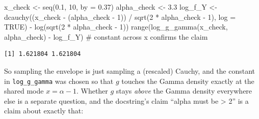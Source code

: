 \documentclass[
  letterpaper,
  DIV=11,
  numbers=noendperiod]{scrreprt}
\newenvironment{Shaded}{\begin{snugshade}}{\end{snugshade}}
\newcommand{\AttributeTok}[1]{\textcolor[rgb]{0.40,0.45,0.13}{#1}}
\newcommand{\CommentTok}[1]{\textcolor[rgb]{0.37,0.37,0.37}{#1}}
\newcommand{\ConstantTok}[1]{\textcolor[rgb]{0.56,0.35,0.01}{#1}}
\newcommand{\DecValTok}[1]{\textcolor[rgb]{0.68,0.00,0.00}{#1}}
\newcommand{\FloatTok}[1]{\textcolor[rgb]{0.68,0.00,0.00}{#1}}
\newcommand{\FunctionTok}[1]{\textcolor[rgb]{0.28,0.35,0.67}{#1}}
\newcommand{\NormalTok}[1]{\textcolor[rgb]{0.00,0.23,0.31}{#1}}
\newcommand{\OtherTok}[1]{\textcolor[rgb]{0.00,0.23,0.31}{#1}}
\newcommand{\SpecialCharTok}[1]{\textcolor[rgb]{0.37,0.37,0.37}{#1}}
\begin{document}
\begin{Shaded}
\begin{Highlighting}[]
\NormalTok{x\_check }\OtherTok{\textless{}{-}} \FunctionTok{seq}\NormalTok{(}\FloatTok{0.1}\NormalTok{, }\DecValTok{10}\NormalTok{, }\AttributeTok{by =} \FloatTok{0.37}\NormalTok{)}
\NormalTok{alpha\_check }\OtherTok{\textless{}{-}} \FloatTok{3.3}
\NormalTok{log\_f\_Y }\OtherTok{\textless{}{-}} \FunctionTok{dcauchy}\NormalTok{((x\_check }\SpecialCharTok{{-}}\NormalTok{ (alpha\_check }\SpecialCharTok{{-}} \DecValTok{1}\NormalTok{)) }\SpecialCharTok{/} \FunctionTok{sqrt}\NormalTok{(}\DecValTok{2} \SpecialCharTok{*}\NormalTok{ alpha\_check }\SpecialCharTok{{-}} \DecValTok{1}\NormalTok{), }\AttributeTok{log =} \ConstantTok{TRUE}\NormalTok{) }\SpecialCharTok{{-}}
    \FunctionTok{log}\NormalTok{(}\FunctionTok{sqrt}\NormalTok{(}\DecValTok{2} \SpecialCharTok{*}\NormalTok{ alpha\_check }\SpecialCharTok{{-}} \DecValTok{1}\NormalTok{))}
\FunctionTok{range}\NormalTok{(}\FunctionTok{log\_g\_gamma}\NormalTok{(x\_check, alpha\_check) }\SpecialCharTok{{-}}\NormalTok{ log\_f\_Y)   }\CommentTok{\# constant across x confirms the claim}
\end{Highlighting}
\end{Shaded}

\begin{verbatim}
[1] 1.621804 1.621804
\end{verbatim}

So sampling the envelope is just sampling a (rescaled) Cauchy, and the
constant in \texttt{log\_g\_gamma} was chosen so that \(g\) touches the
Gamma density exactly at the shared mode \(x = \alpha - 1\). Whether
\(g\) stays \emph{above} the Gamma density everywhere else is a separate
question, and the docstring's claim ``alpha must be \textgreater{} 2''
is a claim about exactly that:
\end{document}
